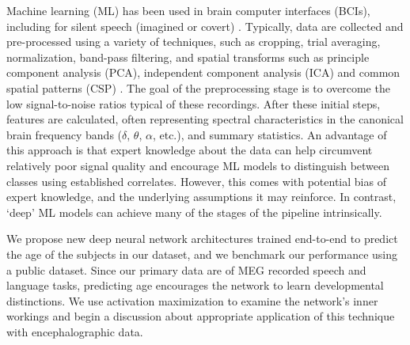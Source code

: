 \documentclass[fleqn,10pt]{wlscirep}
\begin{document}
Machine learning (ML) has been used in brain computer interfaces (BCIs), including for silent speech (imagined or covert) \cite{Sereshkeh2017, Guimaraes2007, Zhao2015a}. Typically, data are collected and pre-processed using a variety of techniques, such as cropping, trial averaging, normalization, band-pass filtering, and spatial transforms such as principle component analysis (PCA), independent component analysis (ICA) and common spatial patterns (CSP) \cite{RezaeiTabar2016,Muller-Gerking1999}. The goal of the preprocessing stage is to overcome the low signal-to-noise ratios typical of these recordings. After these initial steps, features are calculated, often representing spectral characteristics in the canonical brain frequency bands ($\delta$, $\theta$, $\alpha$, etc.), and summary statistics. %
An advantage of this approach is that expert knowledge about the data can help circumvent relatively poor signal quality and encourage ML models to distinguish between classes using established correlates. However, this comes with potential bias of expert knowledge, and the underlying assumptions it may reinforce. In contrast, `deep' ML models can achieve many of the stages of the pipeline intrinsically. %

We propose new deep neural network architectures trained end-to-end to predict the age of the subjects in our dataset, and we benchmark our performance using a public dataset. Since our primary data are of MEG recorded speech and language tasks, predicting age encourages the network to learn developmental distinctions. We use activation maximization to examine the network's inner workings and begin a discussion about appropriate application of this technique with encephalographic data.  
\end{document}

